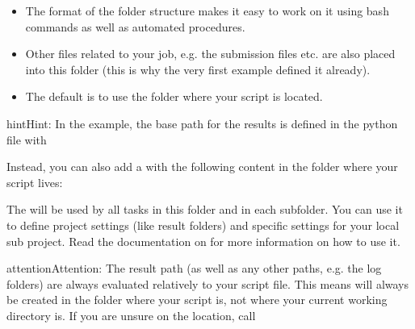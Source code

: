 \documentclass[letterpaper,10pt,english]{sphinxmanual}
\begin{document}
\begin{enumerate}
\begin{itemize}
\item {} 
The format of the folder structure makes it easy to work on it using bash commands as well as
automated procedures.

\item {} 
Other files related to your job, e.g. the submission files etc. are also placed into this
folder (this is why the very first example defined it already).

\item {} 
The default is to use the folder where your script is located.

\end{itemize}

\begin{sphinxadmonition}{hint}{Hint:}
In the example, the base path for the results is defined in the python file with

\begin{sphinxVerbatim}[commandchars=\\\{\}]
 
\end{sphinxVerbatim}

Instead, you can also add a  with the following content
in the folder where your script lives:

\begin{sphinxVerbatim}[commandchars=\\\{\}]
	 
\end{sphinxVerbatim}

The  will be used by all tasks in this folder and in each sub\sphinxhyphen{}folder.
You can use it to define project settings (like result folders) and specific settings for your
local sub project. Read the documentation on {\hyperref[\detokenize{documentation/api:b2luigi.get_setting}]{}} for
more information on how to use it.
\end{sphinxadmonition}

\begin{sphinxadmonition}{attention}{Attention:}
The result path (as well as any other paths, e.g. the log folders) are always evaluated
relatively to your script file.
This means  will always be created in the folder where your script is,
not where your current working directory is.
If you are unsure on the location, call


\end{sphinxadmonition}
\end{enumerate}
\end{document}
